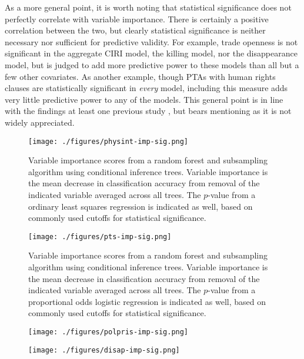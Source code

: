 \documentclass[12pt]{article}
\begin{document}
As a more general point, it is worth noting that statistical significance does not perfectly correlate with variable importance. There is certainly a positive correlation between the two, but clearly statistical significance is neither necessary nor sufficient for predictive validity. For example, trade openness is not significant in the aggregate CIRI model, the killing model, nor the disappearance model, but is judged to add more predictive power to these models than all but a few other covariates. As another example, though PTAs with human rights clauses are statistically significant in {\em every}  model, including this measure adds very little predictive power to any of the models. This general point is in line with the findings at least one previous study \citep{Wardetal2010}, but bears mentioning as it is not widely appreciated. 

\begin{figure}[!htpb]
\centering
\texttt{[image: ./figures/physint-imp-sig.png]}
\caption{Variable importance scores from a random forest and subsampling algorithm using conditional inference trees. Variable importance is the mean decrease in classification accuracy from removal of the indicated variable averaged across all trees. The $p$-value from a ordinary least squares regression is indicated as well, based on commonly used cutoffs for statistical significance.}
\label{fig:physint-imp}
\end{figure}

\begin{figure}[!htpb]
\centering
\texttt{[image: ./figures/pts-imp-sig.png]}
\caption{Variable importance scores from a random forest and subsampling algorithm using conditional inference trees. Variable importance is the mean decrease in classification accuracy from removal of the indicated variable averaged across all trees. The $p$-value from a proportional odds logistic regression is indicated as well, based on commonly used cutoffs for statistical significance.}
\label{fig:pts-imp}
\end{figure}

\begin{figure}[!htpb]
\centering
\texttt{[image: ./figures/polpris-imp-sig.png]}
\caption{}
\label{fig:polpris-imp}
\end{figure}

\begin{figure}[!htpb]
\centering
\texttt{[image: ./figures/disap-imp-sig.png]}
\caption{}
\label{fig:disap-imp}
\end{figure}
\end{document}
